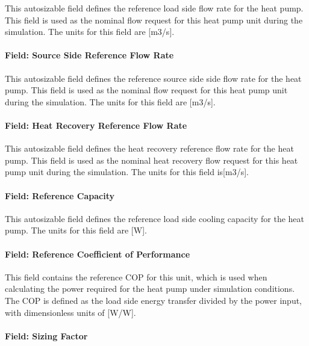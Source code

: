 This autosizable field defines the reference load side flow rate for the heat pump. This field is used as the nominal flow request for this heat pump unit during the simulation. The units for this field are [m3/s].

\paragraph{Field: Source Side Reference Flow Rate}\label{plhp_eir_cooling_inputs_source_side_flow}

This autosizable field defines the reference source side side flow rate for the heat pump. This field is used as the nominal flow request for this heat pump unit during the simulation. The units for this field are [m3/s].

\paragraph{Field: Heat Recovery Reference Flow Rate}\label{plhp_eir_cooling_inputs_heat_recovery_flow}

This autosizable field defines the heat recovery reference flow rate for the heat pump. This field is used as the nominal heat recovery flow request for this heat pump unit during the simulation. The units for this field is[m3/s].

\paragraph{Field: Reference Capacity}\label{plhp_eir_cooling_inputs_reference_capacity}

This autosizable field defines the reference load side cooling capacity for the heat pump. The units for this field are [W].

\paragraph{Field: Reference Coefficient of Performance}\label{plhp_eir_cooling_inputs_reference_cop}

This field contains the reference COP for this unit, which is used when calculating the power required for the heat pump under simulation conditions. The COP is defined as the load side energy transfer divided by the power input, with dimensionless units of [W/W].

\paragraph{Field: Sizing Factor}\label{plhp_eir_cooling_inputs_sizing_factor}

